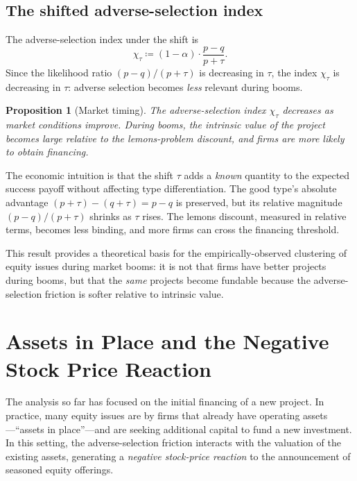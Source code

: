 \documentclass[11pt,a4paper,oneside]{book}
\theoremstyle{plain}
\newtheorem{proposition}[theorem]{Proposition}
\theoremstyle{definition}
\theoremstyle{remark}
\numberwithin{equation}{chapter}
\begin{document}
\subsection{The shifted adverse-selection index}

The adverse-selection index under the shift is
\begin{equation}\label{eq:lemons-chi-tau}
  \chi_\tau \coloneqq (1 - \alpha) \cdot \frac{p - q}{p + \tau}.
\end{equation}
Since the likelihood ratio $(p - q)/(p + \tau)$ is decreasing in $\tau$, the index $\chi_\tau$ is decreasing in $\tau$: adverse selection becomes \emph{less} relevant during booms.

\begin{proposition}[Market timing]\label{prop:lemons-timing}
The adverse-selection index $\chi_\tau$ decreases as market conditions improve.
During booms, the intrinsic value of the project becomes large relative to the lemons-problem discount, and firms are more likely to obtain financing.
\end{proposition}

The economic intuition is that the shift $\tau$ adds a \emph{known} quantity to the expected success payoff without affecting type differentiation.
The good type's absolute advantage $(p + \tau) - (q + \tau) = p - q$ is preserved, but its relative magnitude $(p - q)/(p + \tau)$ shrinks as $\tau$ rises.
The lemons discount, measured in relative terms, becomes less binding, and more firms can cross the financing threshold.

This result provides a theoretical basis for the empirically-observed clustering of equity issues during market booms: it is not that firms have better projects during booms, but that the \emph{same} projects become fundable because the adverse-selection friction is softer relative to intrinsic value.

\section{Assets in Place and the Negative Stock Price Reaction}
\label{sec:lemons-sprr}

The analysis so far has focused on the initial financing of a new project.
In practice, many equity issues are by firms that already have operating assets---``assets in place''---and are seeking additional capital to fund a new investment.
In this setting, the adverse-selection friction interacts with the valuation of the existing assets, generating a \emph{negative stock-price reaction} to the announcement of seasoned equity offerings.
\end{document}
